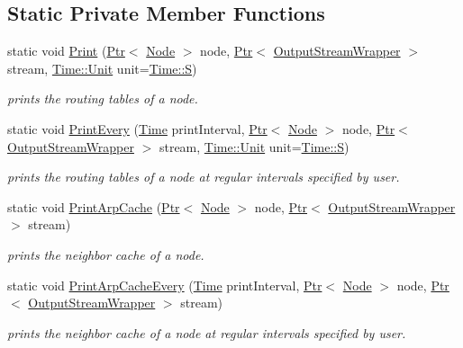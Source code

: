 \subsection*{Static Private Member Functions}
\begin{DoxyCompactItemize}
\item 
static void \hyperlink{classns3_1_1Ipv4RoutingHelper_a76916d127d8b18fd9eb7688d83f9ff20}{Print} (\hyperlink{classns3_1_1Ptr}{Ptr}$<$ \hyperlink{classns3_1_1Node}{Node} $>$ node, \hyperlink{classns3_1_1Ptr}{Ptr}$<$ \hyperlink{classns3_1_1OutputStreamWrapper}{Output\+Stream\+Wrapper} $>$ stream, \hyperlink{classns3_1_1Time_a87a7f4d29c68b047a72d291ad660295a}{Time\+::\+Unit} unit=\hyperlink{classns3_1_1Time_a87a7f4d29c68b047a72d291ad660295aade8622b06524a328cd3a59db6ccf76af}{Time\+::S})
\begin{DoxyCompactList}\small\item\em prints the routing tables of a node. \end{DoxyCompactList}\item 
static void \hyperlink{classns3_1_1Ipv4RoutingHelper_a5a7009aae503d8d191cedfce4f4278c0}{Print\+Every} (\hyperlink{classns3_1_1Time}{Time} print\+Interval, \hyperlink{classns3_1_1Ptr}{Ptr}$<$ \hyperlink{classns3_1_1Node}{Node} $>$ node, \hyperlink{classns3_1_1Ptr}{Ptr}$<$ \hyperlink{classns3_1_1OutputStreamWrapper}{Output\+Stream\+Wrapper} $>$ stream, \hyperlink{classns3_1_1Time_a87a7f4d29c68b047a72d291ad660295a}{Time\+::\+Unit} unit=\hyperlink{classns3_1_1Time_a87a7f4d29c68b047a72d291ad660295aade8622b06524a328cd3a59db6ccf76af}{Time\+::S})
\begin{DoxyCompactList}\small\item\em prints the routing tables of a node at regular intervals specified by user. \end{DoxyCompactList}\item 
static void \hyperlink{classns3_1_1Ipv4RoutingHelper_ae2bcc2aced34f45479b388fa16761e85}{Print\+Arp\+Cache} (\hyperlink{classns3_1_1Ptr}{Ptr}$<$ \hyperlink{classns3_1_1Node}{Node} $>$ node, \hyperlink{classns3_1_1Ptr}{Ptr}$<$ \hyperlink{classns3_1_1OutputStreamWrapper}{Output\+Stream\+Wrapper} $>$ stream)
\begin{DoxyCompactList}\small\item\em prints the neighbor cache of a node. \end{DoxyCompactList}\item 
static void \hyperlink{classns3_1_1Ipv4RoutingHelper_a34f51ee22efe6ae308e4843741e80388}{Print\+Arp\+Cache\+Every} (\hyperlink{classns3_1_1Time}{Time} print\+Interval, \hyperlink{classns3_1_1Ptr}{Ptr}$<$ \hyperlink{classns3_1_1Node}{Node} $>$ node, \hyperlink{classns3_1_1Ptr}{Ptr}$<$ \hyperlink{classns3_1_1OutputStreamWrapper}{Output\+Stream\+Wrapper} $>$ stream)
\begin{DoxyCompactList}\small\item\em prints the neighbor cache of a node at regular intervals specified by user. \end{DoxyCompactList}\end{DoxyCompactItemize}


